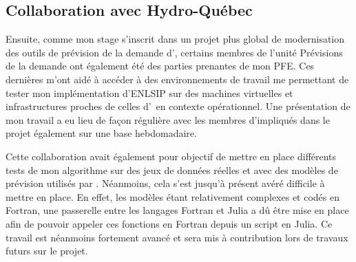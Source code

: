 \subsection*{Collaboration avec Hydro-Québec}

Ensuite, comme mon stage s'inscrit dans un projet plus global de modernisation des outils de prévision de la demande d'\HQ, certains membres de l'unité Prévisions de la demande
ont également été des parties prenantes de mon PFE. Ces dernières m'ont aidé à accéder à des environnements de travail me permettant de tester mon implémentation 
d'ENLSIP sur des machines virtuelles et infrastructures proches de celles d'\HQ\ en contexte opérationnel. Une présentation de mon travail a eu lieu de fa\c con régulière 
avec les membres d'\HQ impliqués dans le projet également sur une base hebdomadaire.

Cette collaboration avait également pour objectif de mettre en place différents tests de mon algorithme sur des jeux de données réelles et avec des modèles de 
prévision utilisés par \HQ. Néanmoins, cela s'est jusqu'à présent avéré difficile à mettre en place. En effet, les modèles étant relativement complexes et 
codés en Fortran, une passerelle entre les langages Fortran et Julia a dû être mise en place afin de pouvoir appeler ces fonctions en Fortran depuis un 
script en Julia. Ce travail est néanmoins fortement avancé et sera mis à contribution lors de travaux futurs sur le projet. 